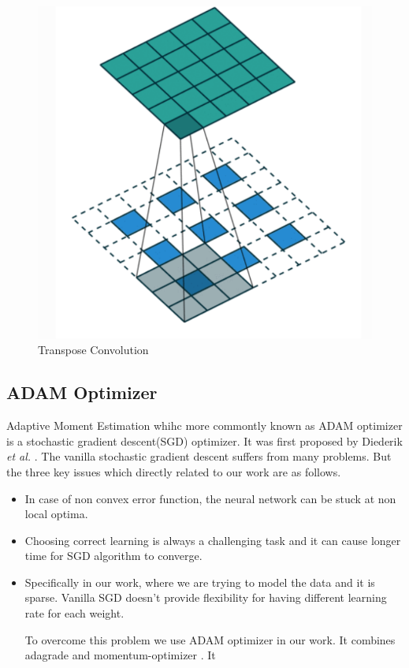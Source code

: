\begin{figure}[ht]
  \centering
    \includegraphics[scale=.4, angle=0]{Files/Frational-Stride-Conv.png}
    \caption[Transpose Convolution ]{Transpose Convolution \cite{Deconv-Theano}}
    \label{fig: Strided Convolution}
\end{figure}



\subsection{ADAM Optimizer}

Adaptive Moment Estimation whihc more commontly known as ADAM optimizer is a stochastic gradient descent(SGD) optimizer. It was first proposed by Diederik \textit{et al.} \cite{Adam}. The vanilla stochastic gradient descent suffers from many problems. But the three key issues which directly related to our work are as follows.
\begin{itemize}
    \item In case of non convex error function, the neural network can be stuck at non local optima.
    \item Choosing correct learning is always a challenging task and it can cause longer time for SGD algorithm to converge.
    \item Specifically in our work, where we are trying to model the data and it is sparse. Vanilla SGD doesn't provide flexibility for having different learning rate for each weight.

To overcome this problem we use ADAM optimizer in our work. It combines adagrade\cite{Adagrade} and momentum-optimizer \cite{momentum}. It 

\end{itemize}
 
 
 